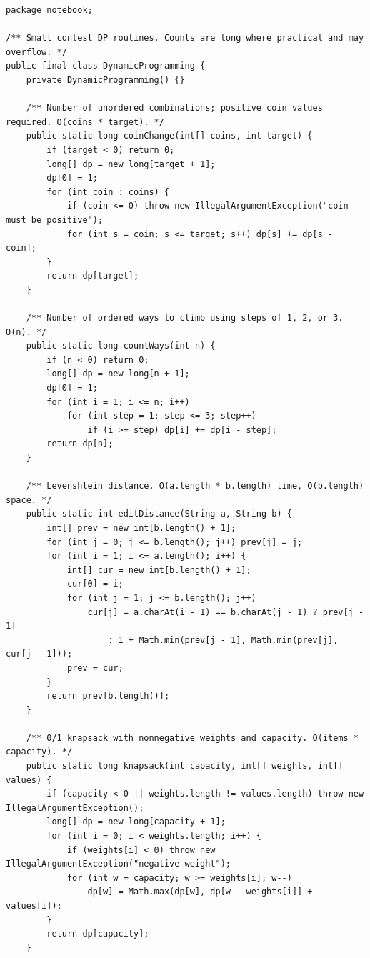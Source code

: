 \documentclass[10pt,letterpaper]{article}
\begin{document}
\begin{lstlisting}
package notebook;

/** Small contest DP routines. Counts are long where practical and may overflow. */
public final class DynamicProgramming {
    private DynamicProgramming() {}

    /** Number of unordered combinations; positive coin values required. O(coins * target). */
    public static long coinChange(int[] coins, int target) {
        if (target < 0) return 0;
        long[] dp = new long[target + 1];
        dp[0] = 1;
        for (int coin : coins) {
            if (coin <= 0) throw new IllegalArgumentException("coin must be positive");
            for (int s = coin; s <= target; s++) dp[s] += dp[s - coin];
        }
        return dp[target];
    }

    /** Number of ordered ways to climb using steps of 1, 2, or 3. O(n). */
    public static long countWays(int n) {
        if (n < 0) return 0;
        long[] dp = new long[n + 1];
        dp[0] = 1;
        for (int i = 1; i <= n; i++)
            for (int step = 1; step <= 3; step++)
                if (i >= step) dp[i] += dp[i - step];
        return dp[n];
    }

    /** Levenshtein distance. O(a.length * b.length) time, O(b.length) space. */
    public static int editDistance(String a, String b) {
        int[] prev = new int[b.length() + 1];
        for (int j = 0; j <= b.length(); j++) prev[j] = j;
        for (int i = 1; i <= a.length(); i++) {
            int[] cur = new int[b.length() + 1];
            cur[0] = i;
            for (int j = 1; j <= b.length(); j++)
                cur[j] = a.charAt(i - 1) == b.charAt(j - 1) ? prev[j - 1]
                    : 1 + Math.min(prev[j - 1], Math.min(prev[j], cur[j - 1]));
            prev = cur;
        }
        return prev[b.length()];
    }

    /** 0/1 knapsack with nonnegative weights and capacity. O(items * capacity). */
    public static long knapsack(int capacity, int[] weights, int[] values) {
        if (capacity < 0 || weights.length != values.length) throw new IllegalArgumentException();
        long[] dp = new long[capacity + 1];
        for (int i = 0; i < weights.length; i++) {
            if (weights[i] < 0) throw new IllegalArgumentException("negative weight");
            for (int w = capacity; w >= weights[i]; w--)
                dp[w] = Math.max(dp[w], dp[w - weights[i]] + values[i]);
        }
        return dp[capacity];
    }


\end{lstlisting}
\end{document}
